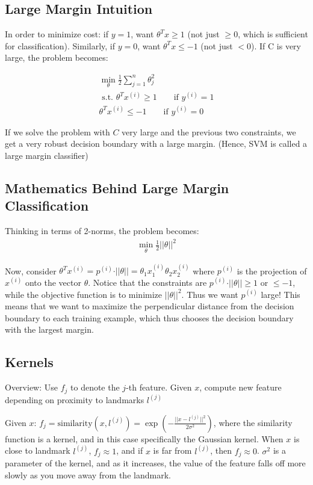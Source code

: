 \documentclass[letterpaper,10pt]{article}
\begin{document}
\subsection{Large Margin Intuition}
In order to minimize cost: if $y=1$, want $\theta^Tx \geq 1$ (not just $\geq 0$, which is sufficient for classification). Similarly, if $y=0$, want $\theta^Tx \leq -1$ (not just $< 0$). If C is very large, the problem becomes: 

\begin{align}
\min_\theta \frac{1}{2} \sum_{j=1}^n \theta_j^2  \\
\text{ s.t. } \theta^Tx^{(i)} \geq 1 \qquad \text{if  } y^{(i)}=1 \\
\theta^Tx^{(i)} \leq -1 \qquad \text{if } y^{(i)}=0
\end{align}

If we solve the problem with $C$ very large and the previous two constraints, we get a very robust decision boundary with a large margin. (Hence, SVM is called a large margin classifier)

\subsection{Mathematics Behind Large Margin Classification}
Thinking in terms of 2-norms, the problem becomes:
\begin{align}
\min_\theta \frac{1}{2} \vert \vert \theta \vert \vert ^2
\end{align}

Now, consider $\theta^Tx^{(i)} = p^{(i)} \cdot \vert \vert \theta \vert \vert = \theta_1 x_1^{(i)} \theta_2 x_2^{(i)}$ where $p^{(i)}$ is the projection of $x^{(i)}$ onto the vector $\theta$. Notice that the constraints are $p^{(i)} \cdot \vert \vert \theta \vert \vert \geq 1$ or $\leq -1$, while the objective function is to minimize $\vert \vert \theta \vert \vert^2$. Thus we want $p^{(i)}$ large! This means that we want to maximize the perpendicular distance from the decision boundary to each training example, which thus chooses the decision boundary with the largest margin.


\subsection{Kernels}
Overview: Use $f_j$ to denote the $j$-th feature. Given $x$, compute new feature depending on proximity to landmarks $l^{(j)}$

Given $x$: $f_j = \text{similarity}(x,l^{(j)}) = \exp \left( - \frac{\vert \vert x-l^{(j)} \vert \vert^2}{2 \sigma^2} \right)$, where the similarity function is a kernel, and in this case specifically the Gaussian kernel. When $x$ is close to landmark $l^{(j)}$, $f_j \approx 1$, and if $x$ is far from $l^{(j)}$, then $f_j \approx 0$. $\sigma^2$ is a parameter of the kernel, and as it increases, the value of the feature falls off more slowly as you move away from the landmark.
\end{document}
